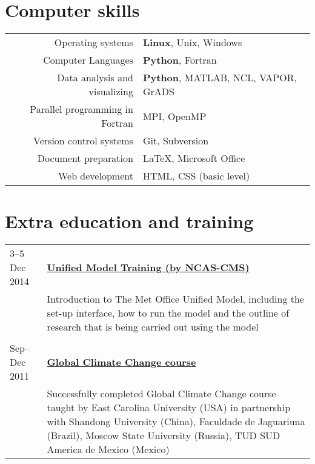 \documentclass[a4paper,11pt]{article}
\newlength{\mycol}
\begin{document}
\section{Computer skills}
\begin{tabular}{rp{10cm}}
	Operating systems & \textbf{Linux}, Unix, Windows \\
	Computer Languages & \textbf{Python}, Fortran \\
	Data analysis and visualizing & \textbf{Python}, MATLAB, NCL, VAPOR, GrADS \\
	Parallel programming in Fortran & MPI, OpenMP \\
	Version control systems & Git, Subversion \\
	Document preparation & \LaTeX, Microsoft Office \\
	Web development & HTML, CSS (basic level)
\end{tabular}

\section{Extra education and training}
\begin{tabu} to 
{\small 3--5 Dec} 2014 & \textbf{\href{http://cms.ncas.ac.uk/wiki/UmTraining}{Unified Model Training (by NCAS-CMS)}} \\
& Introduction to The Met Office Unified Model, including the set-up interface, how to run the model and the outline of research that is being carried out using the model\\
\\

{\small Sep--Dec} 2011 & \textbf{\href{http://gcc.aos.ecu.edu/}{Global Climate Change course}} \\
& Successfully completed Global Climate Change course taught by East Carolina University (USA) in partnership with Shandong University (China), Faculdade de Jaguariuna (Brazil), Moscow State University (Russia), TUD SUD America de Mexico (Mexico)
\end{tabu}
\end{document}
